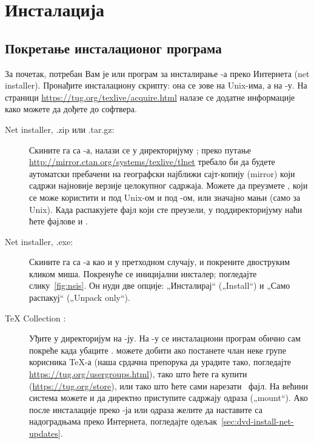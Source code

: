 \documentclass{article}
\begin{document}
\section{Инсталација}
\label{sec:install}


\subsection{Покретање инсталационог програма}
\label{sec:inst-start}

За почетак, потребан Вам је \TK{} \DVD{} или програм за инсталирање
\TL{}-а преко Интернета (\textenglish{net installer}). Пронађите
инсталациону скрипту: она се зове  на Unix-има,
а  на \Windows{}-у. На страници
\url{https://tug.org/texlive/acquire.html} налазе се додатне информације
како можете да дођете до софтвера.

\begin{description}
\item [Net installer, .zip или .tar.gz:] Скините га са \CTAN-а, налази
  се у директоријуму ; преко путање
  \url{http://mirror.ctan.org/systems/texlive/tlnet} требало би да
  будете аутоматски пребачени на географски најближи сајт-копију (mirror)
  који садржи најновије верзије целокупног садржаја. Можете да преузмете
  , који се може користити и под Unix-ом и под
  \Windows{}-ом, или значајно мањи  (само
  за Unix). Када распакујете фајл који сте преузели, у поддиректоријуму
   наћи ћете фајлове  и
  .

\item [Net installer, \Windows{} .exe:] Скините га са \CTAN-а као и у
  претходном случају, и покрените двоструким кликом миша. Покренуће се
  иницијални инсталер; погледајте слику~\ref{fig:nsis}. Он нуди две
  опције: „Инсталирај“ („\textenglish{Install}“) и „Само распакуј“ 
  („\textenglish{Unpack only}“).

\item [\TeX{} Collection \DVD:] Уђите у директоријум 
  на \DVD-ју. На \Windows{}-у се инсталациони програм обично сам
  покреће када убаците \DVD. \DVD можете добити ако постанете члан неке
  групе корисника \TeX-а (наша срдачна препорука да урадите тако,
  погледајте \url{https://tug.org/usergroups.html}), тако што ћете га
  купити (\url{https://tug.org/store}), или тако што ћете сами нарезати
  \ISO\ фајл. На већини система можете и да директно приступите
  садржају \ISO{} одраза („\textenglish{mount}“). Ако после инсталације
  преко \DVD{}-ја или \ISO{} одраза желите да наставите са надоградњама
  преко Интернета, погледајте одељак~\ref{sec:dvd-install-net-updates}.

\end{description}
\end{document}
